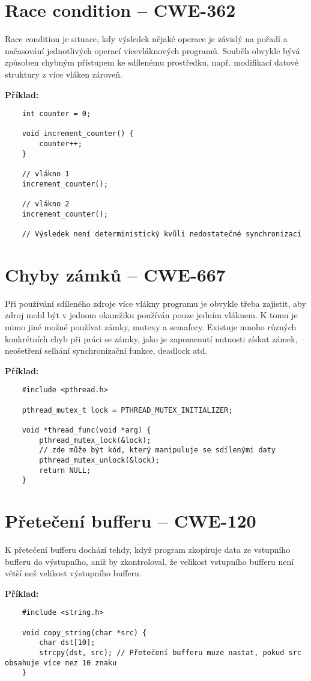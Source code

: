 \documentclass{article}
\begin{document}
\section*{Race condition – CWE-362}

Race condition je situace, kdy výsledek nějaké operace je závislý na pořadí a načasování jednotlivých operací vícevláknových programů. Souběh obvykle bývá způsoben chybným přístupem ke sdílenému prostředku, např. modifikací datové struktury z více vláken zároveň.

\textbf{Příklad:}
\begin{verbatim}
	int counter = 0;
	
	void increment_counter() {
		counter++;
	}
	
	// vlákno 1
	increment_counter();
	
	// vlákno 2
	increment_counter();
	
	// Výsledek není deterministický kvůli nedostatečné synchronizaci
\end{verbatim}

\section*{Chyby zámků – CWE-667}

Při používání sdíleného zdroje více vlákny programu je obvykle třeba zajistit, aby zdroj mohl být v jednom okamžiku používán pouze jedním vláknem. K tomu je mimo jiné možné používat zámky, mutexy a semafory. Existuje mnoho různých konkrétních chyb při práci se zámky, jako je zapomenutí nutnosti získat zámek, neošetření selhání synchronizační funkce, deadlock atd.

\textbf{Příklad:}
\begin{verbatim}
	#include <pthread.h>
	
	pthread_mutex_t lock = PTHREAD_MUTEX_INITIALIZER;
	
	void *thread_func(void *arg) {
		pthread_mutex_lock(&lock);
		// zde může být kód, který manipuluje se sdílenými daty
		pthread_mutex_unlock(&lock);
		return NULL;
	}
\end{verbatim}

\section*{Přetečení bufferu – CWE-120}

K přetečení bufferu dochází tehdy, když program zkopíruje data ze vstupního bufferu do výstupního, aniž by zkontroloval, že velikost vstupního bufferu není větší než velikost výstupního bufferu.

\textbf{Příklad:}
\begin{verbatim}
	#include <string.h>
	
	void copy_string(char *src) {
		char dst[10];
		strcpy(dst, src); // Přetečení bufferu muze nastat, pokud src obsahuje více nez 10 znaku
	}
\end{verbatim}
	
\end{document}
